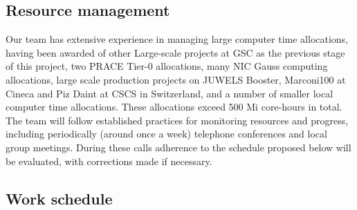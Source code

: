 \subsection{Resource management}

Our team has extensive experience in managing large computer time
allocations, having been awarded of other Large-scale projects at GSC 
as the previous stage of this project,
two PRACE Tier-0 allocations, many
NIC Gauss computing allocations, large scale production projects on
JUWELS Booster, Marconi100 at Cineca and Piz Daint at CSCS in
Switzerland, and a number of smaller local computer time
allocations. These allocations exceed 500 Mi core-hours in total. The
team will follow established practices for monitoring resources and
progress, including periodically (around once a week) telephone
conferences and local group meetings.  During these calls adherence to
the schedule proposed below will be evaluated, with corrections made
if necessary.

\subsection{Work schedule}

